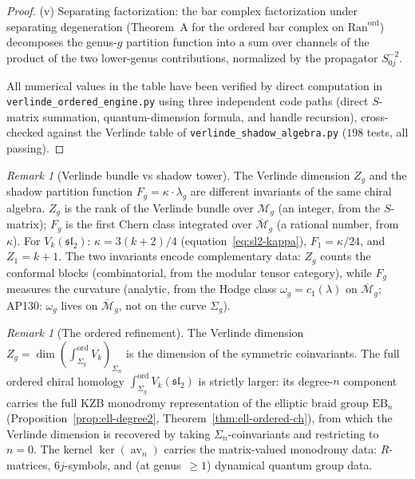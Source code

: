 \documentclass[11pt,reqno]{amsart}
\theoremstyle{definition}
\theoremstyle{remark}
\newtheorem{remark}[theorem]{Remark}
\newcommand{\cM}{\mathcal{M}}
\newcommand{\Ran}{\mathrm{Ran}}
\DeclareMathOperator{\av}{av}
\numberwithin{equation}{section}
\begin{document}
\begin{proof}
\textup{(v)} Separating factorization: the bar complex
factorization under separating degeneration
(Theorem~A for the ordered bar complex on $\Ran^{\mathrm{ord}}$)
decomposes the genus-$g$ partition function into a sum over
channels of the product of the two lower-genus contributions,
normalized by the propagator $S_{0j}^{-2}$.

All numerical values in the table have been verified by
direct computation in
\texttt{verlinde\_ordered\_engine.py}
using three independent code paths
(direct $S$-matrix summation, quantum-dimension formula,
and handle recursion), cross-checked against the Verlinde
table of \texttt{verlinde\_shadow\_algebra.py}
($198$ tests, all passing).
\end{proof}

\begin{remark}[Verlinde bundle vs shadow tower]
\label{rem:verlinde-vs-shadow}
The Verlinde dimension $Z_g$ and the shadow partition
function $F_g = \kappa \cdot \lambda_g$ are different
invariants of the same chiral algebra. $Z_g$ is the rank of
the Verlinde bundle over $\cM_g$ (an integer, from the
$S$-matrix); $F_g$ is the first Chern class integrated
over $\overline{\cM}_g$ (a rational number, from $\kappa$).
For $V_k(\mathfrak{sl}_2)$:
$\kappa = 3(k{+}2)/4$ (equation~\eqref{eq:sl2-kappa}),
$F_1 = \kappa/24$, and $Z_1 = k + 1$.
The two invariants encode complementary data: $Z_g$ counts
the conformal blocks (combinatorial, from the modular tensor
category), while $F_g$ measures the curvature (analytic,
from the Hodge class $\omega_g = c_1(\lambda)$ on
$\overline{\cM}_g$; AP130: $\omega_g$ lives on
$\overline{\cM}_g$, not on the curve $\Sigma_g$).
\end{remark}

\begin{remark}[The ordered refinement]
\label{rem:verlinde-ordered-refinement}
The Verlinde dimension $Z_g = \dim(\int_{\Sigma_g}^{\mathrm{ord}}
V_k)_{\Sigma_n}$ is the dimension of the symmetric coinvariants.
The full ordered chiral homology
$\int_{\Sigma_g}^{\mathrm{ord}} V_k(\mathfrak{sl}_2)$
is strictly larger: its degree-$n$ component carries the
full KZB monodromy representation of the elliptic braid
group $\mathrm{EB}_n$
(Proposition~\ref{prop:ell-degree2},
Theorem~\ref{thm:ell-ordered-ch}), from which the Verlinde
dimension is recovered by taking $\Sigma_n$-coinvariants
and restricting to $n = 0$. The kernel $\ker(\av_n)$
carries the matrix-valued monodromy data: $R$-matrices,
$6j$-symbols, and (at genus~$\geq 1$) dynamical quantum
group data.
\end{remark}
\end{document}
